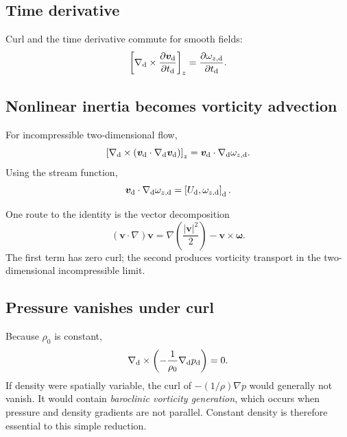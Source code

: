 \documentclass[11pt]{article}
\newcommand{\vect}[1]{\bm{#1}}
\newcommand{\bracket}[2]{\left[#1,#2\right]}
\begin{document}
\subsection{Time derivative}

Curl and the time derivative commute for smooth fields:
\begin{equation}
\left[\nabla_{\rm d}\times
\frac{\partial\vect{v}_{\rm d}}{\partial t_{\rm d}}\right]_z
=\frac{\partial\omega_{z,\rm d}}{\partial t_{\rm d}}.
\end{equation}

\subsection{Nonlinear inertia becomes vorticity advection}

For incompressible two-dimensional flow,
\begin{equation}
\left[\nabla_{\rm d}\times
(\vect{v}_{\rm d}\cdot\nabla_{\rm d}\vect{v}_{\rm d})\right]_z
=\vect{v}_{\rm d}\cdot\nabla_{\rm d}\omega_{z,\rm d}.
\end{equation}
Using the stream function,
\begin{equation}
\vect{v}_{\rm d}\cdot\nabla_{\rm d}\omega_{z,\rm d}
=\bracket{U_{\rm d}}{\omega_{z,\rm d}}_{\rm d}.
\end{equation}

One route to the identity is the vector decomposition
\begin{equation}
(\vect{v}\cdot\nabla)\vect{v}
=\nabla\left(\frac{|\vect{v}|^2}{2}\right)
-\vect{v}\times\boldsymbol{\omega}.
\end{equation}
The first term has zero curl; the second produces vorticity transport in the two-dimensional incompressible limit.

\subsection{Pressure vanishes under curl}

Because $\rho_0$ is constant,
\begin{equation}
\nabla_{\rm d}\times\left(-\frac{1}{\rho_0}\nabla_{\rm d}p_{\rm d}\right)=0.
\end{equation}
If density were spatially variable, the curl of $-(1/\rho)\nabla p$ would generally not vanish. It would contain \emph{baroclinic vorticity generation}, which occurs when pressure and density gradients are not parallel. Constant density is therefore essential to this simple reduction.
\end{document}
